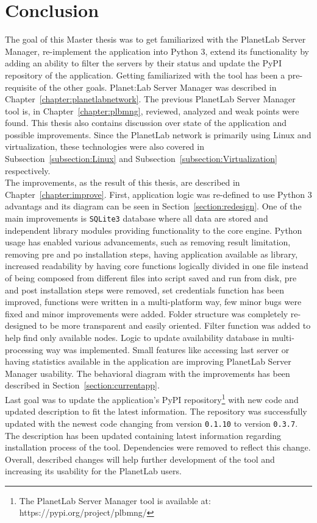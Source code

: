 \chapter{Conclusion}
The goal of this Master thesis was to get familiarized with the PlanetLab Server Manager, re-implement the application into Python 3, extend its functionality by adding an ability to filter the servers by their status and update the PyPI repository of the application. Getting familiarized with the tool has been a pre-requisite of the other goals. Planet:Lab Server Manager was described in Chapter~\ref{chapter:planetlabnetwork}. The previous PlanetLab Server Manager tool is, in Chapter~\ref{chapter:plbmng}, reviewed, analyzed and weak points were found. This thesis also contains discussion over state of the application and possible improvements. Since the PlanetLab network is primarily using Linux and virtualization, these technologies were also covered in Subsection~\ref{subsection:Linux} and Subsection~\ref{subsection:Virtualization} respectively.\\
The improvements, as the result of this thesis, are described in Chapter~\ref{chapter:improve}. First, application logic was re-defined to use Python 3 advantags and its diagram can be seen in Section~\ref{section:redesign}. One of the main improvements is \texttt{SQLite3} database where all data are stored and independent library modules providing functionality to the core engine. Python usage has enabled various advancements, such as removing result limitation, removing pre and po installation steps, having application available as library, increased readability by having core functions logically divided in one file instead of being composed from different files into script saved and run from disk, pre and post installation steps were removed, set credentials function has been improved, functions were written in a multi-platform way, few minor bugs were fixed and minor improvements were added. Folder structure was completely re-designed to be more transparent and easily oriented. Filter function was added to help find only available nodes. Logic to update availability database in multi-processing way was implemented. Small features like accessing last server or having statistics available in the application are improving PlanetLab Server Manager usability. The behavioral diagram with the improvements has been described in Section~\ref{section:currentapp}.\\
Last goal was to update the application's PyPI repository\footnote{The PlanetLab Server Manager tool is available at: https://pypi.org/project/plbmng/} with new code and updated description to fit the latest information. The repository was successfully updated with the newest code changing from version \texttt{0.1.10} to version \texttt{0.3.7}. The description has been updated containing latest information regarding installation process of the tool. Dependencies were removed to reflect this change. Overall, described changes will help further development of the tool and increasing its usability for the PlanetLab users.
